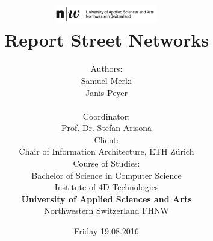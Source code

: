 \documentclass[11pt, a4paper]{report}
\begin{document}
\title{
    \includegraphics[width=1.75in]{fhnw_fhnw_logo_en.png} \\
    \vspace*{1in}
    \textbf{Report Street Networks}}
\author{
    Authors: \\
    Samuel Merki\\
    Janis Peyer\\
    \vspace*{0.4in} \\
    Coordinator: \\
    Prof. Dr. Stefan Arisona
    \vspace*{0.4in} \\
    Client: \\
    Chair of Information Architecture,
    ETH Zürich
    \vspace*{0.4in} \\
    Course of Studies: \\ Bachelor of Science in Computer Science
    \vspace*{0.4in} \\
    Institute of 4D Technologies \\
    \textbf{University of Applied Sciences and Arts  }\\
    Northwestern Switzerland FHNW
} \date{Friday 19.08.2016}
\maketitle



\tableofcontents



\pagebreak


\pagebreak


\pagebreak






\pagebreak


\pagebreak


\pagebreak


\pagebreak



\appendix
\printnoidxglossaries
\end{document}
